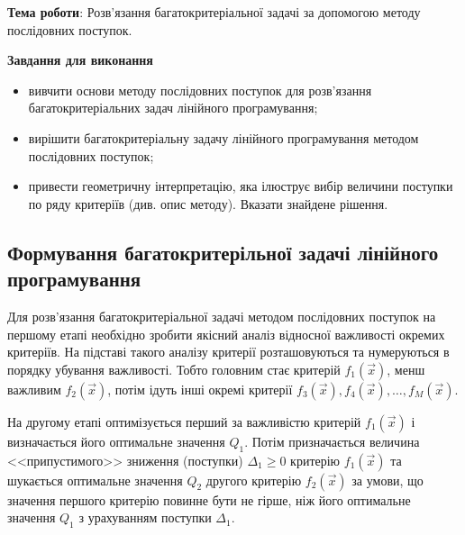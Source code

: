 


\newcommand{\labnumber}{5} %



\usepackage{systeme}
\usepackage{longtable,tabu}
\usepackage{multirow}
\usepackage{array,multirow}
\usepackage{pdflscape}
\usepackage{afterpage}
\usepackage{bm}

\graphicspath{{../figures/}}


\Ukrainian


\addtocounter{page}{1}

\textbf{Тема роботи}: Розв'язання багатокритеріальної задачі за допомогою методу послідовних поступок.

\textbf{Завдання для виконання}
\begin{itemize}
	\item вивчити основи методу послідовних поступок для розв'язання багатокритеріальних задач лінійного програмування;
	\item вирішити багатокритеріальну задачу лінійного програмування методом послідовних поступок;
	\item привести геометричну інтерпретацію, яка ілюструє вибір величини поступки по ряду критеріїв (див. опис методу). 
	Вказати знайдене рішення.
\end{itemize}



\subsection{Формування багатокритерільної задачі лінійного програмування}
Для розв'язання багатокритеріальної задачі методом послідовних поступок на першому етапі необхідно зробити якісний аналіз відносної важливості окремих критеріїв.
На підставі такого аналізу критерії розташовуються та нумеруються в порядку убування важливості. 
Тобто головним стає критерій $f_1(\vec{x})$, менш важливим $f_2(\vec{x})$, потім ідуть інші окремі критерії $f_3(\vec{x}), f_4(\vec{x}), \dots, f_M(\vec{x})$.

На другому етапі оптимізується перший за важливістю критерій $f_1(\vec{x})$ і визначається його оптимальне значення $Q_1$. 
Потім призначається величина <<припустимого>> зниження (поступки) $\Delta_1 \geq 0$ критерію $f_1(\vec{x})$ та шукається оптимальне значення $Q_2$ другого критерію $f_2(\vec{x})$ за умови, що значення першого критерію повинне бути не гірше, ніж його оптимальне значення $Q_1$ з урахуванням поступки $\Delta_1$.

